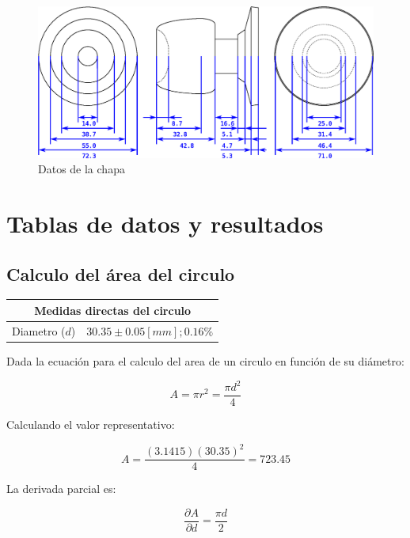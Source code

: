 \documentclass[letter,11pt]{article}
\begin{document}
\begin{figure}
\centering
\includegraphics[width=1.00\textwidth]{eps/02_08.chapa.eps}
\caption{Datos de la chapa}
\label{chapa}
\end{figure}

\section{Tablas de datos y resultados}

\subsection{Calculo del área del circulo}
\begin{center}
\begin{tabular}{|c|>{\centering}m{5.0cm}<{\centering}|}
\hline
\multicolumn{2}{|c|}{\textbf{Medidas directas del circulo}}
\tabularnewline \hline
Diametro ($d$) & $30.35 \pm 0.05 [mm]; 0.16\%$ \tabularnewline \hline
\end{tabular}
\end{center}

Dada la ecuación para el calculo del area de un circulo en función de su
diámetro:

\begin{equation}
    A = \pi r^2 = \frac{\pi d^2}{4}
\end{equation}

Calculando el valor representativo:

\begin{equation}
    A = \frac{(3.1415)(30.35)^2}{4} = 723.45
\end{equation}

La derivada parcial es:

\begin{equation}
    \frac{\partial{A}}{\partial{d}} = \frac{\pi d}{2}
\end{equation}
\end{document}
